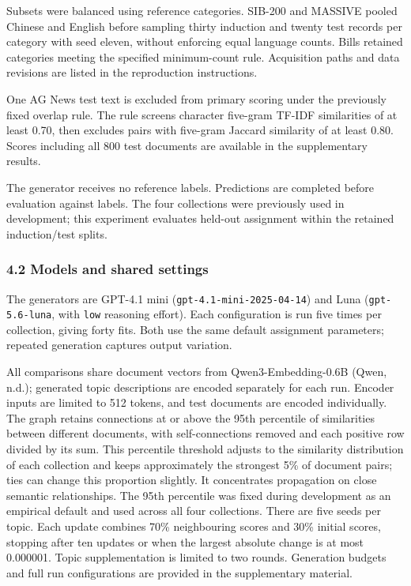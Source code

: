 \documentclass[
  11pt,
  a4paper,
]{article}
\begin{document}
Subsets were balanced using reference categories. SIB-200 and MASSIVE
pooled Chinese and English before sampling thirty induction and twenty
test records per category with seed eleven, without enforcing equal
language counts. Bills retained categories meeting the specified
minimum-count rule. Acquisition paths and data revisions are listed in
the reproduction instructions.

One AG News test text is excluded from primary scoring under the
previously fixed overlap rule. The rule screens character five-gram
TF-IDF similarities of at least 0.70, then excludes pairs with five-gram
Jaccard similarity of at least 0.80. Scores including all 800 test
documents are available in the supplementary results.

The generator receives no reference labels. Predictions are completed
before evaluation against labels. The four collections were previously
used in development; this experiment evaluates held-out assignment
within the retained induction/test splits.

\subsubsection{4.2 Models and shared
settings}\label{models-and-shared-settings}

The generators are GPT-4.1 mini (\texttt{gpt-4.1-mini-2025-04-14}) and
Luna (\texttt{gpt-5.6-luna}, with \texttt{low} reasoning effort). Each
configuration is run five times per collection, giving forty fits. Both
use the same default assignment parameters; repeated generation captures
output variation.

All comparisons share document vectors from Qwen3-Embedding-0.6B (Qwen,
n.d.); generated topic descriptions are encoded separately for each run.
Encoder inputs are limited to 512 tokens, and test documents are encoded
individually. The graph retains connections at or above the 95th
percentile of similarities between different documents, with
self-connections removed and each positive row divided by its sum. This
percentile threshold adjusts to the similarity distribution of each
collection and keeps approximately the strongest 5\% of document pairs;
ties can change this proportion slightly. It concentrates propagation on
close semantic relationships. The 95th percentile was fixed during
development as an empirical default and used across all four
collections. There are five seeds per topic. Each update combines 70\%
neighbouring scores and 30\% initial scores, stopping after ten updates
or when the largest absolute change is at most 0.000001. Topic
supplementation is limited to two rounds. Generation budgets and full
run configurations are provided in the supplementary material.
\end{document}
